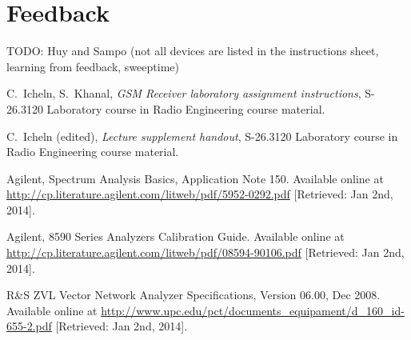 \documentclass[a4paper, 12pt]{article}
\begin{document}
\newpage
\section{Feedback}

TODO: Huy and Sampo (not all devices are listed in the instructions sheet, learning from feedback, sweeptime)


\newpage
\begin{thebibliography}{9}%

 C.\ Icheln, S.\ Khanal, 
	\textit{GSM Receiver laboratory assignment instructions},
	S-26.3120 Laboratory course in Radio Engineering course material.
	
\bibitem{} C.\ Icheln (edited), 
	\textit{Lecture supplement handout},
	S-26.3120 Laboratory course in Radio Engineering course material.

 Agilent, Spectrum Analysis Basics, Application Note 150. 
	Available online at \url{http://cp.literature.agilent.com/litweb/pdf/5952-0292.pdf} 
	[Retrieved: Jan 2nd, 2014].
	
 Agilent, 8590 Series Analyzers Calibration Guide.
	Available online at \url{http://cp.literature.agilent.com/litweb/pdf/08594-90106.pdf}
	[Retrieved: Jan 2nd, 2014].
	
 R\&S ZVL Vector Network Analyzer Specifications, 
	Version 06.00, Dec 2008. 
	Available online at \url{http://www.upc.edu/pct/documents_equipament/d_160_id-655-2.pdf} 
	[Retrieved: Jan 2nd, 2014].


	

	

\end{thebibliography}
\end{document}
